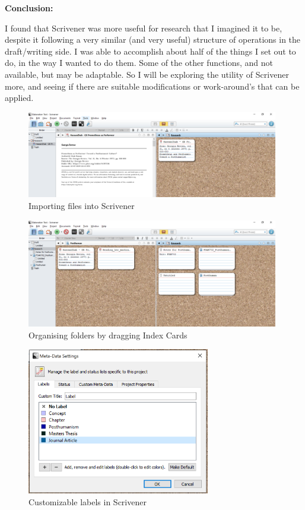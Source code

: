 \documentclass{article}
\begin{document}
\textbf{Conclusion:}

I found that Scrivener was more useful for research that I imagined it to be, despite it following a very similar (and very useful) structure of operations in the draft/writing side. 
I was able to accomplish about half of the things I set out to do, in the way I wanted to do them. Some of the other functions, and not available, but may be adaptable. So I will be exploring the utility of Scrivener more, and seeing if there are suitable modifications or work-around's that can be applied.

\begin{figure}[htbp]
    \centering
    \includegraphics[width=11cm]{Images/ScrivenerTest001.PNG}
    \caption{Importing files into Scrivener}
    \label{fig:Scivener Research Screen}
\end{figure}

\begin{figure}[htbp]
    \centering
    \includegraphics[width=11cm]{Images/ScrivenerTest002.PNG}
    \caption{Organising folders by dragging Index Cards}
    \label{fig:Scrivener Folder Organisation}
\end{figure}

\begin{figure}[htbp]
    \centering
    \includegraphics[width=8cm]{Images/ScrivenerTest003.PNG}
    \caption{Customizable labels in Scrivener}
    \label{fig:Scrivener Labels}
\end{figure}
\end{document}
